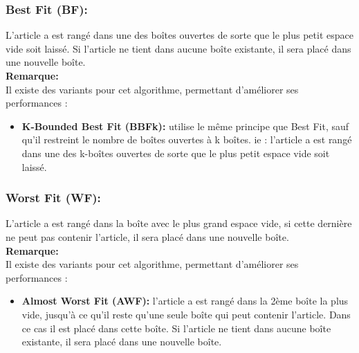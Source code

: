 \documentclass[class=report, crop=false]{standalone}
\begin{document}
        \subsubsection{Best Fit (BF):} L’article a est rangé dans une des boîtes ouvertes de sorte que le plus petit espace vide soit laissé. Si l’article ne tient dans aucune boîte existante, il sera placé dans une nouvelle boîte. 
        \\ \textbf{Remarque:} \\
        Il existe des variants pour cet algorithme, permettant d’améliorer ses performances : 
        \renewcommand{\labelitemi}{$\circ$}  
        \begin{itemize}
            \item \textbf{K-Bounded Best Fit (BBFk): } utilise le même principe que Best Fit, sauf qu’il restreint le nombre de boîtes ouvertes à k boîtes. ie : l’article a est rangé dans une des k-boîtes ouvertes de sorte que le plus petit espace vide soit laissé. 
        \end{itemize}
        \subsubsection{Worst Fit (WF): }L’article a est rangé dans la boîte avec le plus grand espace vide, si cette dernière ne peut pas contenir l’article, il sera placé dans une nouvelle boîte.
        \\ \textbf{Remarque:} \\
        Il existe des variants pour cet algorithme, permettant d’améliorer ses performances : 
        \renewcommand{\labelitemi}{$\circ$}  
        \begin{itemize}
            \item \textbf{Almost Worst Fit (AWF): }l’article a est rangé dans la 2ème boîte la plus vide, jusqu’à ce qu’il reste qu’une seule boîte qui peut contenir l’article. Dans ce cas il est placé dans cette boîte. Si l’article ne tient dans aucune boîte existante, il sera placé dans une nouvelle boîte.
        \end{itemize}
\end{document}
